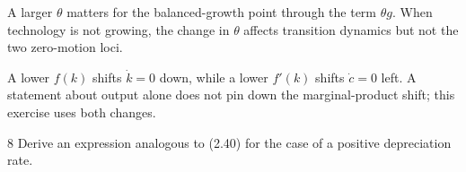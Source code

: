 \begin{note}[The special case \(g=0\)]
    A larger \(\theta\) matters for the balanced-growth point through the
    term \(\theta g\). When technology is not growing, the change in
    \(\theta\) affects transition dynamics but not the two zero-motion loci.
\end{note}

\begin{note}
    A lower \(f(k)\) shifts \(\dot k=0\) down, while a lower \(f'(k)\)
    shifts \(\dot c=0\) left. A statement about output alone does not pin
    down the marginal-product shift; this exercise uses both changes.
\end{note}

\begin{problem}{8}
Derive an expression analogous to (2.40) for the case of a positive depreciation rate.
\end{problem}


